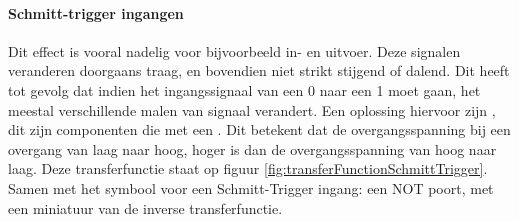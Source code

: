 \paragraph{Schmitt-trigger ingangen} Dit effect is vooral nadelig voor bijvoorbeeld in- en uitvoer. Deze signalen veranderen doorgaans traag, en bovendien niet strikt stijgend of dalend. Dit heeft tot gevolg dat indien het ingangssignaal van een 0 naar een 1 moet gaan, het meestal verschillende malen van signaal verandert. Een oplossing hiervoor zijn , dit zijn componenten die met een . Dit betekent dat de overgangsspanning bij een overgang van laag naar hoog, hoger is dan de overgangsspanning van hoog naar laag. Deze transferfunctie staat op figuur \ref{fig:transferFunctionSchmittTrigger}. Samen met het symbool voor een Schmitt-Trigger ingang: een NOT poort, met een miniatuur van de inverse transferfunctie.
